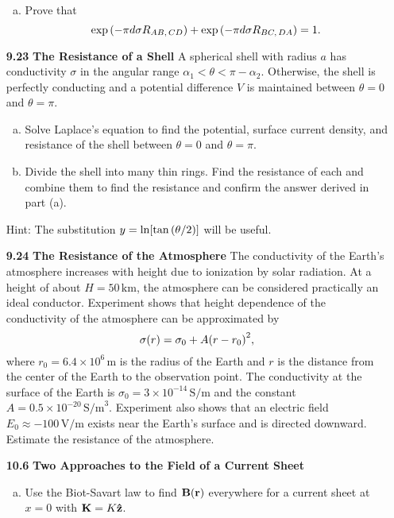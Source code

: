 \documentclass{article}
\begin{document}
\begin{enumerate}[align=parleft,labelsep=20pt]
\begin{enumerate}[(a), align=parleft,labelsep=20pt]
        \item Prove that
        \[
            \exp\pqty{-\pi d\sigma R_{AB,\,CD}} + \exp\pqty{-\pi d\sigma R_{BC,\,DA}} = 1.
        \]
    \end{enumerate}

    \item [\textbf{9.23 }] \textbf{The Resistance of a Shell } A spherical shell with radius $a$ has conductivity $\sigma$ in the angular range $\alpha_1 < \theta < \pi - \alpha_2$. Otherwise, the shell is perfectly conducting and a potential difference $V$ is maintained between $\theta = 0$ and $\theta = \pi$.
    \begin{enumerate}[(a), align=parleft,labelsep=20pt]
        \item Solve Laplace's equation to find the potential, surface current density, and resistance of the shell between $\theta = 0$ and $\theta = \pi$.

        \item Divide the shell into many thin rings. Find the resistance of each and combine them to find the resistance and confirm the answer derived in part (a).
    \end{enumerate}
    Hint: The substitution $y = \ln\!\bqty{\tan\pqty{\theta /2}}$ will be useful.

    \item [\textbf{9.24 }] \textbf{The Resistance of the Atmosphere } The conductivity of the Earth's atmosphere increases with height due to ionization by solar radiation. At a height of about $H=50\,\si{\km}$, the atmosphere can be considered practically an ideal conductor. Experiment shows that height dependence of the conductivity of the atmosphere can be approximated by
    \[
        \sigma(r) = \sigma_0 + A\pqty{r-r_0}^2,
    \]
    where $r_0 = 6.4\times 10^6\,\si{\m}$ is the radius of the Earth and $r$ is the distance from the center of the Earth to the observation point. The conductivity at the surface of the Earth is $\sigma_0 = 3\times 10^{-14}\,\text{S/m}$ and the constant $A = 0.5\times 10^{-20}\,\text{S/m}^3$. Experiment also shows that an electric field $E_0 \approx -100\,\si{\V/\m}$ exists near the Earth's surface and is directed downward. Estimate the resistance of the atmosphere.

    \item [\textbf{10.6 }] \textbf{Two Approaches to the Field of a Current Sheet }
    \begin{enumerate}[(a), align=parleft,labelsep=20pt]
        \item Use the Biot-Savart law to find $\vb{B}(\vb{r})$ everywhere for a current sheet at $x=0$ with $\vb{K} = K\vu{z}$.


\end{enumerate}
\end{enumerate}
\end{document}
